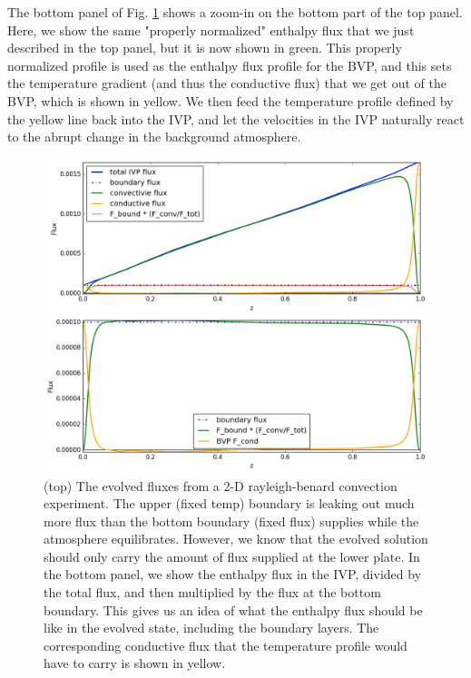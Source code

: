 \documentclass[aps, pre, onecolumn, nofootinbib, notitlepage, groupedaddress, amsfonts, amssymb, amsmath, longbibliography]{revtex4-1}
\begin{document}
\begin{enumerate}
The bottom panel of Fig. \ref{fig:flux_fig} shows a zoom-in on the bottom part of the top panel.
Here, we show the same "properly normalized" enthalpy flux that we just described in the top panel,
but it is now shown in green.  This properly normalized profile is used as the enthalpy flux profile
for the BVP, and this sets the temperature gradient (and thus the conductive flux) that we get
out of the BVP, which is shown in yellow.  We then feed the temperature profile defined by
the yellow line back into the IVP, and let the velocities in the IVP naturally react to the abrupt
change in the background atmosphere.

\begin{figure}
\centering
\includegraphics[width=\textwidth]{./figs/bvp_fluxes.png}
\caption{(top) The evolved fluxes from a 2-D rayleigh-benard convection experiment.  The upper
(fixed temp) boundary is leaking out much more flux than the bottom boundary (fixed flux) supplies
while the atmosphere equilibrates.  However, we know that the evolved solution should only carry
the amount of flux supplied at the lower plate.  In the bottom panel, we show the enthalpy flux
in the IVP, divided by the total flux, and then multiplied by the flux at the bottom boundary. This
gives us an idea of what the enthalpy flux should be like in the evolved state, including the
boundary layers.  The corresponding conductive flux that the temperature profile would have to
carry is shown in yellow. \label{fig:flux_fig}}
\end{figure}


\end{enumerate}
\end{document}
